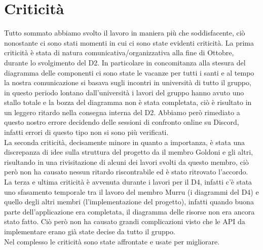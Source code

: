 \section{Criticità}
Tutto sommato abbiamo svolto il lavoro in maniera più che soddisfacente, ciò nonostante ci sono stati momenti in cui ci sono state evidenti criticità. La prima criticità è stata di natura comunicativa/organizzativa alla fine di Ottobre, durante lo svolgimento del D2. In particolare in concomitanza alla stesura del diagramma delle componenti ci sono state le vacanze per tutti i santi e al tempo la nostra comunicazione si basava sugli incontri in università di tutto il gruppo, in questo periodo lontano dall'università i lavori del gruppo hanno avuto uno stallo totale e la bozza del diagramma non è stata completata, ciò è risultato in un leggero ritardo nella consegna interna del D2. Abbiamo però rimediato a questo nostro errore decidendo delle sessioni di confronto online su Discord, infatti errori di questo tipo non si sono più verificati. \\
La seconda criticità, decisamente minore in quanto a importanza, è stata una discrepanza di idee sulla struttura del progetto da il membro Goldoni e gli altri, risultando in una rivisitazione di alcuni dei lavori svolti da questo membro, ciò però non ha causato nessun ritardo riscontrabile ed è stato ritrovato l'accordo. \\
La terza e ultima criticità è avvenuta durante i lavori per il D4, infatti c'è stata uno sfasamento temporale tra il lavoro del membro Murru (i diagrammi del D4) e quello degli altri membri (l'implementazione del progetto), infatti quando buona parte dell'applicazione era completata, il diagramma delle risorse non era ancora stato fatto. Ciò però non ha causato grandi complicazioni visto che le API da implementare erano già state decise da tutto il gruppo. \\
Nel complesso le criticità sono state affrontate e usate per migliorare.